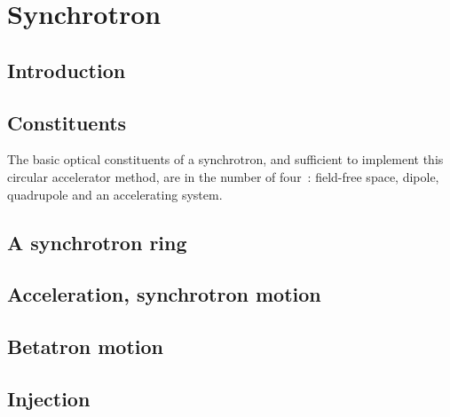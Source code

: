 



\chapter[Synchrotron]{Synchrotron}\label{chapSynchrotron}


\section{Introduction \label{secSynchIntro}}




\section{Constituents \label{secSynchConstituents}}


The basic optical constituents of a synchrotron, and sufficient to implement this circular accelerator method, 
are in the number of four~:  field-free space, dipole, quadrupole and an accelerating system.  


\section{A synchrotron ring \label{secSynchRing}}


\section{Acceleration, synchrotron motion \label{secSynchAccel}}



\section{Betatron motion \label{secSynchBetatronMotion}}


\section{Injection \label{secSynchInj}}

